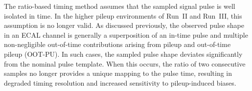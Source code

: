 The ratio-based timing method assumes that the sampled signal pulse is well isolated in time.
In the higher pileup environments of Run~II and Run~III, this assumption is no longer valid.
As discussed previously, the observed pulse shape in an ECAL channel is generally a superposition of an in-time pulse and multiple non-negligible out-of-time contributions arising from pileup and out-of-time pileup (OOT-PU).
In such cases, the sampled pulse shape deviates significantly from the nominal pulse template.
When this occurs, the ratio of two consecutive samples no longer provides a unique mapping to the pulse time, resulting in degraded timing resolution and increased sensitivity to pileup-induced biases.
